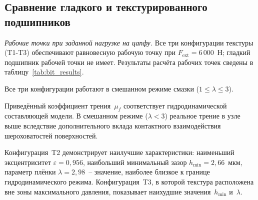 \subsection{Сравнение гладкого и текстурированного подшипников}

\textit{Рабочие точки при заданной нагрузке на цапфу.}
Все три конфигурации текстуры (T1-T3) обеспечивают равновесную
рабочую точку при $F_{\mathrm{ext}} = 6\,000$~Н; гладкий
подшипник рабочей точки не имеет. Результаты расчёта рабочих точек
сведены в таблицу~\ref{tab:bit_results}.

\begin{table}[!ht]
\centering
\caption{Характеристики подшипника в рабочей точке
  при $F_{\mathrm{ext}} = 6\,000$~Н}
\label{tab:bit_results}
\end{table}

\FloatBarrier

Все три конфигурации работают в смешанном режиме смазки
($1 \leq \lambda \leq 3$).

Приведённый коэффициент трения~$\mu_f$ соответствует
гидродинамической составляющей модели. В смешанном режиме
($\lambda < 3$) реальное трение в узле выше вследствие
дополнительного вклада контактного взаимодействия шероховатостей
поверхностей.

Конфигурация~T2 демонстрирует наилучшие характеристики:
наименьший эксцентриситет $\varepsilon = 0{,}956$, наибольший
минимальный зазор $h_{\min} = 2{,}66$~мкм, параметр плёнки
$\lambda = 2{,}98$~-- значение, наиболее близкое к границе
гидродинамического режима. Конфигурация~T3, в которой текстура
расположена вне зоны максимального давления, показывает наихудшие
значения~$h_{\min}$ и~$\lambda$.


